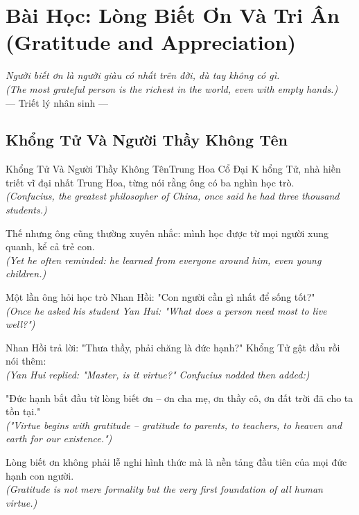 \chapter{Bài Học: Lòng Biết Ơn Và Tri Ân (Gratitude and Appreciation)}
\begin{center}
  \textit{\color{truyenblue}Người biết ơn là người giàu có nhất trên đời, dù tay không có gì.}\\
  \textit{(The most grateful person is the richest in the world, even with empty hands.)}\\[4pt]
  \small\color{truyengold}--- Triết lý nhân sinh ---
\end{center}
\ngancach

\section{Khổng Tử Và Người Thầy Không Tên}
\begin{truyen}{Khổng Tử Và Người Thầy Không Tên}{Trung Hoa Cổ Đại}
K hổng Tử, nhà hiền triết vĩ đại nhất Trung Hoa, từng nói rằng ông có ba nghìn học trò.\\
\textit{(Confucius, the greatest philosopher of China, once said he had three thousand students.)}

Thế nhưng ông cũng thường xuyên nhắc: mình học được từ mọi người xung quanh, kể cả trẻ con.\\
\textit{(Yet he often reminded: he learned from everyone around him, even young children.)}

Một lần ông hỏi học trò Nhan Hồi: "Con người cần gì nhất để sống tốt?"\\
\textit{(Once he asked his student Yan Hui: "What does a person need most to live well?")}

Nhan Hồi trả lời: "Thưa thầy, phải chăng là đức hạnh?" Khổng Tử gật đầu rồi nói thêm:\\
\textit{(Yan Hui replied: "Master, is it virtue?" Confucius nodded then added:)}

"Đức hạnh bắt đầu từ lòng biết ơn -- ơn cha mẹ, ơn thầy cô, ơn đất trời đã cho ta tồn tại."\\
\textit{("Virtue begins with gratitude -- gratitude to parents, to teachers, to heaven and earth for our existence.")}

\end{truyen}
\begin{baihoc}
  Lòng biết ơn không phải lễ nghi hình thức mà là nền tảng đầu tiên của mọi đức hạnh con người.\\
  \textit{(Gratitude is not mere formality but the very first foundation of all human virtue.)}
\end{baihoc}

